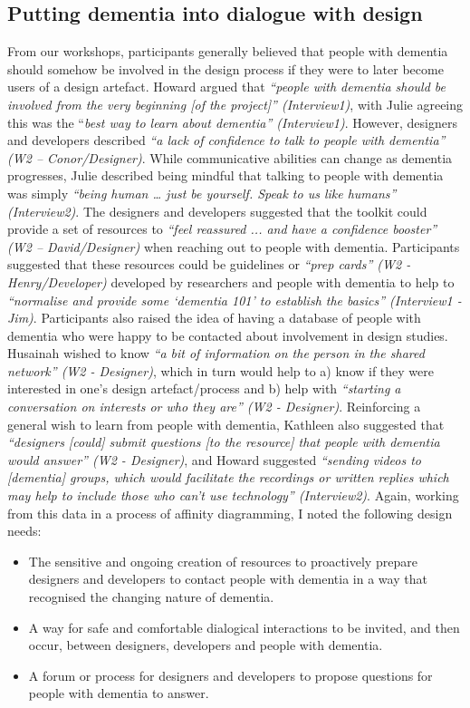 \subsection{Putting dementia into dialogue with design}
From our workshops, participants generally believed that people with dementia should somehow be involved in the design process if they were to later become users of a design artefact. Howard argued that \textit{``people with dementia should be involved from the very beginning [of the project]'' (Interview1)}, with Julie agreeing this was the ``\textit{best way to learn about dementia'' (Interview1)}. However, designers and developers described \textit{``a lack of confidence to talk to people with dementia'' (W2 – Conor/Designer)}. While communicative abilities can change as dementia progresses, Julie described being mindful that talking to people with dementia was simply \textit{``being human … just be yourself. Speak to us like humans'' (Interview2)}.
The designers and developers suggested that the toolkit could provide a set of resources to \textit{``feel reassured ... and have a confidence booster'' (W2 – David/Designer)} when reaching out to people with dementia. Participants suggested that these resources could be guidelines or \textit{``prep cards'' (W2 - Henry/Developer)} developed by researchers and people with dementia to help to \textit{``normalise and provide some ‘dementia 101’ to establish the basics'' (Interview1 - Jim)}. Participants also raised the idea of having a database of people with dementia who were happy to be contacted about involvement in design studies. Husainah wished to know \textit{``a bit of information on the person in the shared network'' (W2 - Designer)}, which in turn would help to a) know if they were interested in one's design artefact/process and b) help with \textit{``starting a conversation on interests or who they are'' (W2 - Designer)}.
Reinforcing a general wish to learn from people with dementia, Kathleen also suggested that \textit{``designers [could] submit questions [to the resource] that people with dementia would answer'' (W2 - Designer)}, and Howard suggested \textit{``sending videos to [dementia] groups, which would facilitate the recordings or written replies which may help to include those who can't use technology'' (Interview2)}. Again, working from this data in a process of affinity diagramming, I noted the following design needs:
\begin{itemize}
\item The sensitive and ongoing creation of resources to proactively prepare designers and developers to contact people with dementia in a way that recognised the changing nature of dementia. 
\item A way for safe and comfortable dialogical interactions to be invited, and then occur, between designers, developers and people with dementia.
\item A forum or process for designers and developers to propose questions for people with dementia to answer.
\end{itemize}

